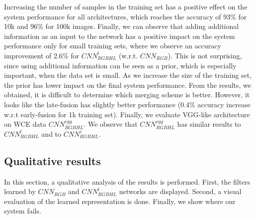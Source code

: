 \documentclass[review,12pt,3p]{elsarticle}
\begin{document}
Increasing the number of samples in the training set has a positive effect on the system performance for all architectures, which reaches the accuracy of 93\% for 10k and 96\% for 100k images. Finally, we can observe that adding additional information as an input to the network has a positive impact on the system performance only for small training sets, where we observe an accuracy improvement of 2.6\% for $CNN^l_{RGBHL}$ (w.r.t. $CNN_{RGB}$). This is not surprising, since using additional information can be seen as a prior, which is especially important, when the data set is small. As we increase the size of the training set, the prior has lower impact on the final system performance. From the results, we obtained, it is difficult to determine which merging scheme is better. However, it looks like the late-fusion has slightly better performance (0.4\% accuracy increase w.r.t early-fusion for 1k training set). Finally, we evaluate VGG-like architecture on WCE data $CNN^{vgg}_{RGBHL}$. We observe that $CNN^{vgg}_{RGBHL}$ has similar results to $CNN^l_{RGBHL}$ and to $CNN^e_{RGBHL}$.

\begin{table}[!ht]
\centering
{}
\caption{Introducing additional information. The numbers represent classification accuracy in percentages.}
\label{tab:fusion}
\end{table}


\subsection{Qualitative results}

In this section, a qualitative analysis of the results is performed. First, the filters learned by $CNN_{RGB}$ and $CNN^l_{RGBHL}$ networks are displayed. Second, a visual evaluation of the learned representation is done. Finally, we show where our system fails.
\end{document}

